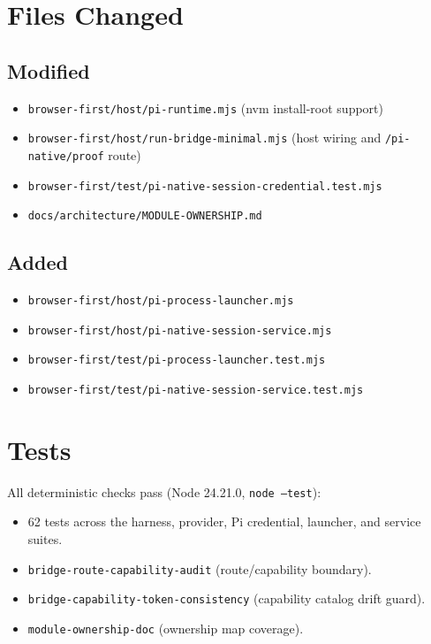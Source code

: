 \documentclass[11pt]{article}
\newcommand{\code}[1]{\texttt{#1}}
\begin{document}
\section{Files Changed}

\subsection{Modified}

\begin{itemize}
  \item \code{browser-first/host/pi-runtime.mjs} (nvm install-root support)
  \item \code{browser-first/host/run-bridge-minimal.mjs} (host wiring and
    \code{/pi-native/proof} route)
  \item \code{browser-first/test/pi-native-session-credential.test.mjs}
  \item \code{docs/architecture/MODULE-OWNERSHIP.md}
\end{itemize}

\subsection{Added}

\begin{itemize}
  \item \code{browser-first/host/pi-process-launcher.mjs}
  \item \code{browser-first/host/pi-native-session-service.mjs}
  \item \code{browser-first/test/pi-process-launcher.test.mjs}
  \item \code{browser-first/test/pi-native-session-service.test.mjs}
\end{itemize}

\section{Tests}

All deterministic checks pass (Node 24.21.0, \code{node --test}):

\begin{itemize}
  \item 62 tests across the harness, provider, Pi credential, launcher, and
    service suites.
  \item \code{bridge-route-capability-audit} (route/capability boundary).
  \item \code{bridge-capability-token-consistency} (capability catalog drift
    guard).
  \item \code{module-ownership-doc} (ownership map coverage).
\end{itemize}
\end{document}
